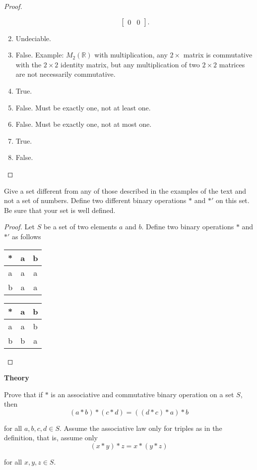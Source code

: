\begin{proof}
\begin{enumerate}[label={\textbf{\alph*.}},itemsep=0pt,topsep=0pt]
\[\begin{bmatrix}
                      0 & 0
                  \end{bmatrix}.
              \]
        \item Undeciable.
        \item False. Example: $M_{2}(\mathbb{R})$ with multiplication, any $2\times$ matrix is commutative with the $2\times 2$ identity matrix, but any multiplication of two $2\times 2$ matrices are not necessarily commutative.
        \item True.
        \item False. Must be exactly one, not at least one.
        \item False. Must be exactly one, not at most one.
        \item True.
        \item False.
    \end{enumerate}
\end{proof}

\begin{exercise}
    Give a set different from any of those described in the examples of the text and not a set of numbers. Define two different binary operations $*$ and $*'$ on this set. Be sure that your set is well defined.
\end{exercise}

\begin{proof}
    Let $S$ be a set of two elements $a$ and $b$. Define two binary operations $*$ and $*'$ as follows
    \begin{tabular}{c|cc}
        * & a & b \\
        \hline
        a & a & a \\
        b & a & a
    \end{tabular}
    \begin{tabular}{c|cc}
        * & a & b \\
        \hline
        a & a & b \\
        b & b & a
    \end{tabular}
\end{proof}

\textbf{Theory}

\begin{exercise}
    Prove that if $*$ is an associative and commutative binary operation on a set $S$, then
    \[
        (a * b) * (c * d) = ((d * c) * a) * b
    \]

    for all $a, b, c, d\in S$. Assume the associative law only for triples as in the definition, that is, assume only
    \[
        (x * y) * z = x * (y * z)
    \]

    for all $x, y, z\in S$.
\end{exercise}

